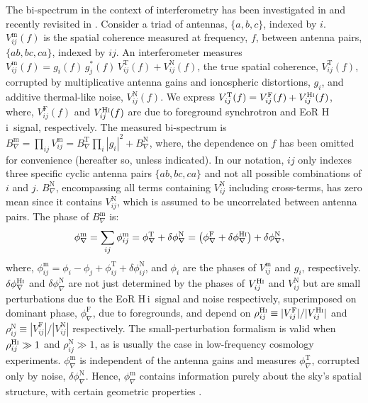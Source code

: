 \documentclass[
reprint,
superscriptaddress,
amsmath,
amssymb,
aps,
prd
]{revtex4-1}
\newcommand{\HI}{H\,{\sc i}}
\begin{document}
The bi-spectrum in the context of interferometry has been investigated in \cite{jen58,kul89,tay99,tho01,mon06} and recently revisited in \cite{car18}. Consider a triad of antennas, $\{a, b, c\}$, indexed by $i$. $V_{ij}^\textrm{m}(f)$ is the spatial coherence measured at frequency, $f$, between antenna pairs, $\{ab, bc, ca\}$, indexed by $ij$. An interferometer measures $V_{ij}^\textrm{m}(f) = g_i(f)\, g_j^*(f)\, V_{ij}^\textrm{T}(f) + V_{ij}^\textrm{N}(f)$, the  true spatial coherence, $V_{ij}^\textrm{T}(f)$, corrupted by multiplicative antenna gains and ionospheric distortions, $g_i$, and additive thermal-like noise, $V_{ij}^\textrm{N}(f)$. We express $V_{ij}^\textrm{T}(f) = V_{ij}^\textrm{F}(f) + V_{ij}^\textrm{H{\sc i}}(f)$, where, $V_{ij}^\textrm{F}(f)$ and $V_{ij}^\textrm{H{\sc i}}(f)$ are due to foreground synchrotron and EoR \HI\ signal, respectively. The measured bi-spectrum is $B_\nabla^\textrm{m}=\prod_{ij} V_{ij}^\textrm{m}=B_\nabla^\textrm{T}\prod_i |g_i|^2+B_\nabla^\textrm{N}$, where, the dependence on $f$ has been omitted for convenience (hereafter so, unless indicated). In our notation, $ij$ only indexes three specific cyclic antenna pairs $\{ab, bc, ca\}$ and not all possible combinations of $i$ and $j$. $B_\nabla^\textrm{N}$, encompassing all terms containing $V_{ij}^\textrm{N}$ including cross-terms, has zero mean since it contains $V_{ij}^\textrm{N}$, which is assumed to be uncorrelated between antenna pairs. The phase of $B_\nabla^\textrm{m}$ is:
\begin{align}
  \phi_\nabla^\textrm{m} &= \sum_{ij}\phi_{ij}^\textrm{m} = \phi_\nabla^\textrm{T} + \delta\phi_\nabla^\textrm{N} = \left(\phi_\nabla^\textrm{F} + \delta\phi_\nabla^\textrm{H{\sc i}}\right) + \delta\phi_\nabla^\textrm{N} \label{eqn:cpphase-sum},
\end{align}
where, $\phi_{ij}^\textrm{m} = \phi_i - \phi_j + \phi_{ij}^\textrm{T} + \delta\phi_{ij}^\textrm{N}$, and $\phi_i$ are the phases of $V_{ij}^\textrm{m}$ and $g_i$, respectively. $\delta\phi_\nabla^\textrm{H{\sc i}}$ and $\delta\phi_\nabla^\textrm{N}$ are not just determined by the phases of $V_{ij}^\textrm{H{\sc i}}$ and $V_{ij}^\textrm{N}$ but are small  perturbations due to the EoR \HI\ signal and noise respectively, superimposed on dominant phase, $\phi_\nabla^\textrm{F}$, due to foregrounds, and depend on $\rho_{ij}^\textrm{H{\sc i}}\equiv |V_{ij}^\textrm{F}|/|V_{ij}^\textrm{H{\sc i}}|$ and $\rho_{ij}^\textrm{N}\equiv |V_{ij}^\textrm{F}|/|V_{ij}^\textrm{N}|$ respectively. The small-perturbation formalism is valid when $\rho_{ij}^\textrm{H{\sc i}}\gg 1$ and $\rho_{ij}^\textrm{N}\gg 1$, as is usually the case in low-frequency cosmology experiments. $\phi_\nabla^\textrm{m}$ is independent of the antenna gains and measures $\phi_\nabla^\textrm{T}$, corrupted only by noise, $\delta\phi_\nabla^\textrm{N}$. Hence, $\phi_\nabla^\textrm{m}$ contains information purely about the sky's spatial structure, with certain geometric properties \cite[see][]{mon07}.
\end{document}
